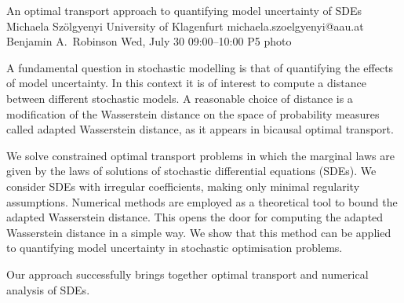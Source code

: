 \clearpage
\begin{talk}
  {An optimal transport approach to quantifying model uncertainty of SDEs}%
  {Michaela Sz\"olgyenyi}%
  {University of Klagenfurt}%
  {michaela.szoelgyenyi@aau.at}%
  {Benjamin A.~Robinson}%
  {}%
  {Wed, July 30 09:00–10:00}%
  {P5}%
  {photo}%
  
				

A fundamental question in stochastic modelling is that of quantifying the effects of model uncertainty. In this context it is of interest to compute a distance between different stochastic models. A  reasonable choice of distance is a modification of the Wasserstein distance on the space of probability measures called adapted Wasserstein distance, as it appears in bicausal optimal transport.

	We solve constrained optimal transport problems in which the marginal laws are given by the laws of solutions of stochastic differential equations (SDEs). We consider SDEs with irregular coefficients, making only minimal regularity assumptions. Numerical methods are employed as a theoretical tool to bound the adapted Wasserstein distance. This opens the door for computing the adapted Wasserstein distance in a simple way. We show that this method can be applied to quantifying model uncertainty in stochastic optimisation problems. 	
	
	Our approach successfully brings together optimal transport and numerical analysis of SDEs. 
\end{talk}

